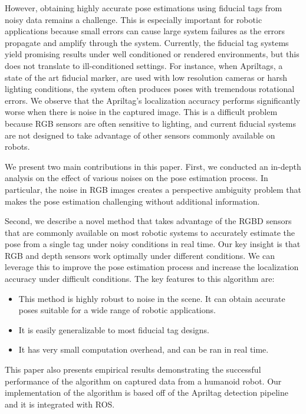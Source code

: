However, obtaining highly accurate pose estimations using fiducial tags from noisy data remains a challenge. This is especially important for robotic applications because small errors can cause large system failures as the errors propagate and amplify through the system. Currently, the fiducial tag systems yield promising results under well conditioned or rendered environments, but this does not translate to ill-conditioned settings. For instance, when Apriltags, a state of the art fiducial marker, are used with low resolution cameras or harsh lighting conditions, the system often produces poses with tremendous rotational errors. We observe that the Apriltag's localization accuracy performs significantly worse when there is noise in the captured image. This is a difficult problem because RGB sensors are often sensitive to lighting, and current fiducial systems are not designed to take advantage of other sensors commonly available on robots.

We present two main contributions in this paper. First, we conducted an in-depth analysis on the effect of various noises on the pose estimation process. In particular, the noise in RGB images creates a perspective ambiguity problem that makes the pose estimation challenging without additional information. 

Second, we describe a novel method that takes advantage of the RGBD sensors that are commonly available on most robotic systems to accurately estimate the pose from a single tag under noisy conditions in real time. Our key insight is that RGB and depth sensors work optimally under different conditions. We can leverage this to improve the pose estimation process and increase the localization accuracy under difficult conditions. The key features to this algorithm are: 
\begin{itemize}
\item This method is highly robust to noise in the scene. It can obtain accurate poses suitable for a wide range of robotic applications.   
\item It is easily generalizable to most fiducial tag designs.
\item It has very small computation overhead, and can be ran in real time. 
\end{itemize}

This paper also presents empirical results demonstrating the successful performance of the algorithm on captured data from a humanoid robot. Our implementation of the algorithm is based off of the Apriltag detection pipeline and it is integrated with ROS. 